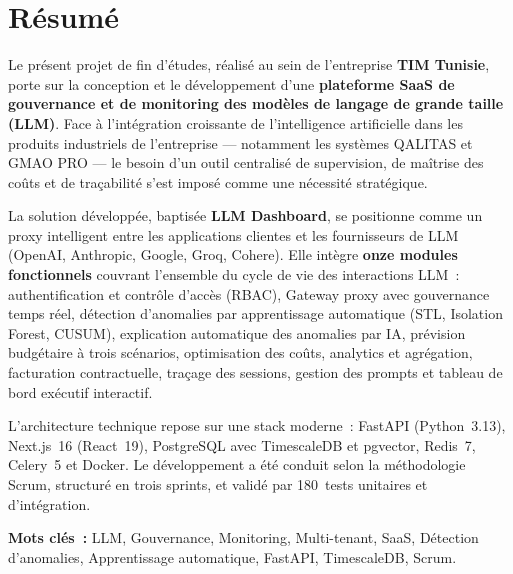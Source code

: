
\chapter*{Résumé}

\vspace{0.5cm}

Le présent projet de fin d'études, réalisé au sein de l'entreprise \textbf{TIM Tunisie}, porte sur la conception et le développement d'une \textbf{plateforme SaaS de gouvernance et de monitoring des modèles de langage de grande taille (LLM)}. Face à l'intégration croissante de l'intelligence artificielle dans les produits industriels de l'entreprise --- notamment les systèmes QALITAS et GMAO PRO --- le besoin d'un outil centralisé de supervision, de maîtrise des coûts et de traçabilité s'est imposé comme une nécessité stratégique.

La solution développée, baptisée \textbf{LLM Dashboard}, se positionne comme un proxy intelligent entre les applications clientes et les fournisseurs de LLM (OpenAI, Anthropic, Google, Groq, Cohere). Elle intègre \textbf{onze modules fonctionnels} couvrant l'ensemble du cycle de vie des interactions LLM~: authentification et contrôle d'accès (RBAC), Gateway proxy avec gouvernance temps réel, détection d'anomalies par apprentissage automatique (STL, Isolation Forest, CUSUM), explication automatique des anomalies par IA, prévision budgétaire à trois scénarios, optimisation des coûts, analytics et agrégation, facturation contractuelle, traçage des sessions, gestion des prompts et tableau de bord exécutif interactif.

L'architecture technique repose sur une stack moderne~: FastAPI (Python~3.13), Next.js~16 (React~19), PostgreSQL avec TimescaleDB et pgvector, Redis~7, Celery~5 et Docker. Le développement a été conduit selon la méthodologie Scrum, structuré en trois sprints, et validé par 180~tests unitaires et d'intégration.

\vspace{0.5cm}

\textbf{Mots clés~:} LLM, Gouvernance, Monitoring, Multi-tenant, SaaS, Détection d'anomalies, Apprentissage automatique, FastAPI, TimescaleDB, Scrum.

\newpage
